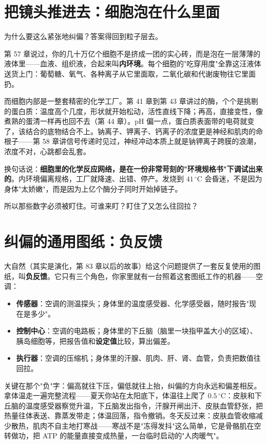 \section{把镜头推进去：细胞泡在什么里面}

为什么要这么紧张地纠偏？答案得回到粒子层去。

第 57 章说过，你的几十万亿个细胞不是挤成一团的实心砖，而是泡在一层薄薄的液体里——血液、组织液，合起来叫\textbf{内环境}。每个细胞的"吃穿用度"全靠这汪液体送货上门：葡萄糖、氧气、各种离子从它里面取，二氧化碳和代谢废物往它里面扔。

而细胞内部是一整套精密的化学工厂。第 41 章到第 43 章讲过的酶，个个是挑剔的蛋白质：温度高个几度，形状就开始松动，活性直线下降；再高，直接变性，像煮熟的蛋清一样再也回不去（第 44 章）。pH 偏一点，蛋白质表面带的电荷就变了，该结合的底物结合不上。钠离子、钾离子、钙离子的浓度更是神经和肌肉的命根子——第 58 章讲信号传递时见过，神经冲动本质上就是钠钾离子跨膜的浪潮，浓度不对，心跳都会乱套。

换句话说：\textbf{细胞里的化学反应网络，是在一份非常苛刻的"环境规格书"下调试出来的}。内环境偏离规格，工厂就降速、出错、停产。发烧到 $41\,^{\circ}\mathrm{C}$ 会昏迷，不是因为身体"太娇嫩"，而是因为上亿个酶分子同时开始掉链子。

所以那些数字必须被盯住。可谁来盯？盯住了又怎么往回拉？

\section{纠偏的通用图纸：负反馈}

大自然（其实是演化，第 83 章以后的故事）给这个问题提供了一套反复使用的图纸，叫\textbf{负反馈}。它只有三个角色，你家里就有一台照着这套图纸工作的机器——空调：

\begin{itemize}[itemsep=2pt]
\item \textbf{传感器}：空调的测温探头；身体里的温度感受器、化学感受器，随时报告"现在是多少"。
\item \textbf{控制中心}：空调的电路板；身体里的下丘脑（脑里一块指甲盖大小的区域）、胰岛细胞等，把报告值和\textbf{设定值}比较，算出偏差。
\item \textbf{执行器}：空调的压缩机；身体里的汗腺、肌肉、肝、肾、血管，负责把数值往回拉。
\end{itemize}

关键在那个"负"字：偏高就往下压，偏低就往上抬，纠偏的方向永远和偏差相反。拿体温走一遍完整流程——夏天你站在太阳底下，体温往上爬了 $0.5\,^{\circ}\mathrm{C}$：皮肤和下丘脑的温度感受器察觉升温，下丘脑发出指令，汗腺开闸出汗、皮肤血管舒张，把热量往体表送、靠蒸发带走；体温回落，指令撤销。冬天反过来：皮肤血管收缩减少散热，肌肉不自主地打寒战——寒战不是"冻得发抖"这么简单，它是骨骼肌在空转做功，把 ATP 的能量直接变成热量，一台临时启动的"人肉暖气"。

